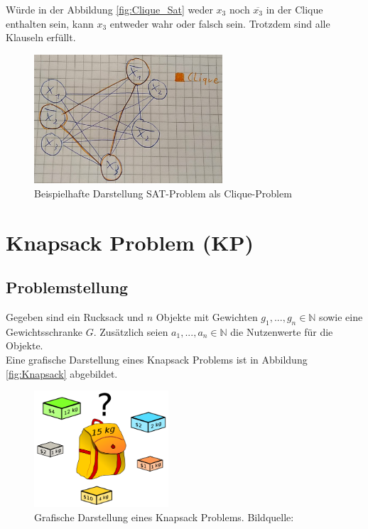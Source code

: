 \documentclass[ngerman]{article}
\begin{document}
Würde in der Abbildung \vref{fig:Clique_Sat} weder $x_3$ noch $\overline{x_3}$ in der Clique enthalten sein, kann $x_3$ entweder wahr oder falsch sein.
Trotzdem sind alle Klauseln erfüllt.
\begin{figure}[H]
	\centering
	\includegraphics[width=7cm]{figures/clique_sat.png}
	\caption{Beispielhafte Darstellung SAT-Problem als Clique-Problem}
	\label{fig:Clique_Sat}
\end{figure}

\section{Knapsack Problem (KP)}
\subsection{Problemstellung}
Gegeben sind ein Rucksack und \(n\) Objekte mit Gewichten \(g_1,...,g_n \in \mathbb{N}\) sowie eine Gewichtsschranke $G$.
Zusätzlich seien \(a_1,...,a_n \in \mathbb{N}\) die Nutzenwerte für die Objekte.\\
Eine grafische Darstellung eines Knapsack Problems ist in Abbildung \vref{fig:Knapsack} abgebildet.

\begin{figure}[H]
	\centering
	\includegraphics[width=5cm]{figures/knapsack.png}
	\caption[Grafische Darstellung eines Knapsack Problems]{Grafische Darstellung eines Knapsack Problems. Bildquelle: \cite{knapSackImage1}}
	\label{fig:Knapsack}
\end{figure}
\end{document}
